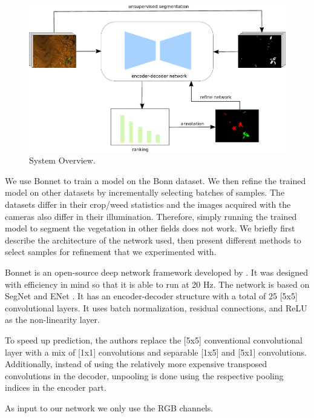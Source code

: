 \documentclass[letterpaper, 10 pt, conference]{ieeeconf}  %
\begin{document}
    \begin{figure}
    \centering
    \includegraphics[scale=0.9]{pics/output_system_overview.pdf}
   		\caption{System Overview.}
		\label{fig:overview}    		
   \end{figure}


We use Bonnet \cite{milioto2018bonnet} to train a model on the Bonn dataset. We then refine the trained model on other datasets by incrementally selecting batches of samples. The datasets differ in their crop/weed statistics and the images acquired with the cameras also differ in their illumination. Therefore, simply running the trained model to segment the vegetation in other fields does not work. We briefly first describe the architecture of the network used, then present different methods to select samples for refinement that we experimented with.


Bonnet is an open-source deep network framework developed by \cite{milioto2018bonnet}. It was designed with efficiency in mind so that it is able to run at 20 Hz. The network is based on SegNet \cite{badrinarayanan2017segnet} and ENet \cite{paszke2016enet}. It has an encoder-decoder structure with a total of 25 [5x5] convolutional layers. It uses batch normalization, residual connections, and ReLU as the non-linearity layer. 

To speed up prediction, the authors replace the [5x5] conventional convolutional layer with a mix of [1x1] convolutions and separable [1x5] and [5x1] convolutions. Additionally, instead of using the relatively more expensive transposed convolutions in the decoder, unpooling is done using the respective pooling indices in the encoder part.

As input to our network we only use the RGB channels.
\end{document}
